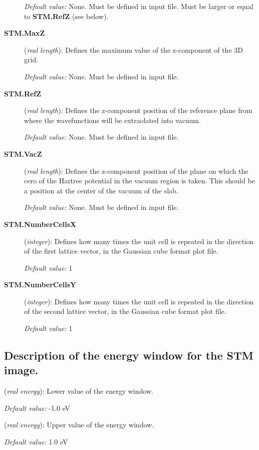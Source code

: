 \begin{description}
{\it Default value:} None. Must be defined in input file. Must
be larger or equal to {\bf STM.RefZ} (see below).

\item[{\bf STM.MaxZ}] ({\it real length}):
 Defines the maximum value of the z-component of the 3D grid.

{\it Default value:} None. Must be defined in input file.

\item[{\bf STM.RefZ}] ({\it real length}):
 Defines the z-component position of the reference plane from
 where the wavefunctions will be extraolated into vacuum.

{\it Default value:} None. Must be defined in input file.

\item[{\bf STM.VacZ}] ({\it real length}):
 Defines the z-component position of the plane on which the
 cero of the Hartree potential in the vacuum region is taken.
 This should be a position at the center of the vacuum of the slab.

{\it Default value:} None. Must be defined in input file.

\item[{\bf STM.NumberCellsX}] ({\it integer}):
Defines how many times the unit cell is repeated
in the direction of the first lattice vector,
in the Gaussian cube format plot file.

{\it Default value:} 1

\item[{\bf STM.NumberCellsY}] ({\it integer}):
Defines how many times the unit cell is repeated
in the direction of the second lattice vector,
in the Gaussian cube format plot file.

{\it Default value:} 1

\end{description}

\vspace{5pt}
\subsection{Description of the energy window for the STM image.}

\begin{description}
\itemsep 10pt
\parsep 0pt

\item[{\bf STM.Emin}] ({\it real energy}): 
Lower value of the energy window.

{\it Default value:} -1.0 eV

\item[{\bf STM.Emax}] ({\it real energy}): 
Upper value of the energy window.

{\it Default value:} 1.0 eV

\end{description}



